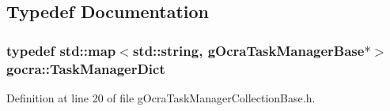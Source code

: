 \subsection{Typedef Documentation}
\subsubsection[{\texorpdfstring{Task\+Manager\+Dict}{TaskManagerDict}}]{\setlength{\rightskip}{0pt plus 5cm}typedef std\+::map$<$std\+::string, {\bf g\+Ocra\+Task\+Manager\+Base}$\ast$$>$ {\bf gocra\+::\+Task\+Manager\+Dict}}\hypertarget{namespacegocra_ad407175473be2e361f2937acf73ca06c}{}\label{namespacegocra_ad407175473be2e361f2937acf73ca06c}


Definition at line 20 of file g\+Ocra\+Task\+Manager\+Collection\+Base.\+h.

